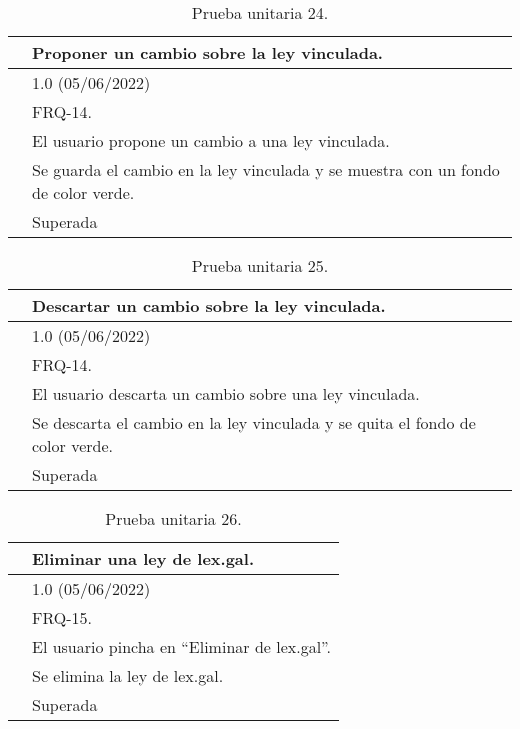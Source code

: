 \begin{table}[H]
\begin{center}
\begin{tabular}{|p{3cm}|p{10cm}|} \hline
\centering {\bf PU-24} & Proponer un cambio sobre la ley vinculada.  \\ \hline\hline
\centering {\bf Versión} & 1.0 (05/06/2022) \\ \hline
\centering {\bf Dependencias} & FRQ-14. \\ \hline
\centering {\bf Descripción} &  El usuario propone un cambio a una ley vinculada. \\ \hline
\centering {\bf Criterio de aceptación} & Se guarda el cambio en la ley vinculada y se muestra con un fondo de color verde. \\ \hline
\centering {\bf Estado} & Superada \\ \hline
\end{tabular}
\caption{Prueba unitaria 24.}
\label{enlacePU24}
\end{center}
\end{table}

\begin{table}[H]
\begin{center}
\begin{tabular}{|p{3cm}|p{10cm}|} \hline
\centering {\bf PU-25} & Descartar un cambio sobre la ley vinculada.  \\ \hline\hline
\centering {\bf Versión} & 1.0 (05/06/2022) \\ \hline
\centering {\bf Dependencias} & FRQ-14. \\ \hline
\centering {\bf Descripción} &  El usuario descarta un cambio sobre una ley vinculada. \\ \hline
\centering {\bf Criterio de aceptación} & Se descarta el cambio en la ley vinculada y se quita el fondo de color verde. \\ \hline
\centering {\bf Estado} & Superada \\ \hline
\end{tabular}
\caption{Prueba unitaria 25.}
\label{enlacePU25}
\end{center}
\end{table}

\begin{table}[H]
\begin{center}
\begin{tabular}{|p{3cm}|p{10cm}|} \hline
\centering {\bf PU-26} & Eliminar una ley de lex.gal.  \\ \hline\hline
\centering {\bf Versión} & 1.0 (05/06/2022) \\ \hline
\centering {\bf Dependencias} & FRQ-15. \\ \hline
\centering {\bf Descripción} &  El usuario pincha en ``Eliminar de lex.gal''. \\ \hline
\centering {\bf Criterio de aceptación} & Se elimina la ley de lex.gal. \\ \hline
\centering {\bf Estado} & Superada \\ \hline
\end{tabular}
\caption{Prueba unitaria 26.}
\label{enlacePU26}
\end{center}
\end{table}

